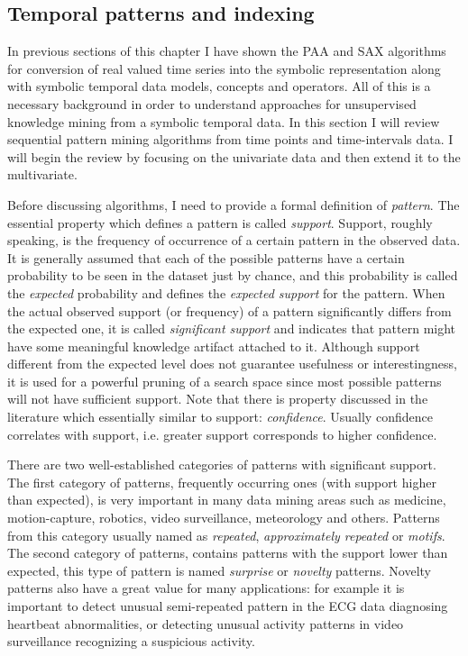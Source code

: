 \subsection{Temporal patterns and indexing} \label{tpatterns}
In previous sections of this chapter I have shown the PAA and SAX algorithms for conversion of real valued time series into the symbolic representation along with symbolic temporal data models, concepts and operators. All of this is a necessary background in order to understand approaches for unsupervised knowledge mining from a symbolic temporal data. In this section I will review sequential pattern mining algorithms from time points and time-intervals data. I will begin the review by focusing on the univariate data and then extend it to the multivariate.

Before discussing algorithms, I need to provide a formal definition of \textit{pattern}. The essential property which defines a pattern is called \textit{support}. Support, roughly speaking, is the frequency of occurrence of a certain pattern in the observed data. It is generally assumed that each of the possible patterns have a certain probability to be seen in the dataset just by chance, and this probability is called the \textit{expected} probability and defines the \textit{expected support} for the pattern. When the actual observed support (or frequency) of a pattern significantly differs from the expected one, it is called \textit{significant support} and indicates that pattern might have some meaningful knowledge artifact attached to it. Although support different from the expected level does not guarantee usefulness or interestingness, it is used for a powerful pruning of a search space since most possible patterns will not have sufficient support. Note that there is property \cite{citeulike:2804633} discussed in the literature which essentially similar to support: \textit{confidence}. Usually confidence correlates with support, i.e. greater support corresponds to higher confidence.

There are two well-established categories of patterns with significant support. The first category of patterns, frequently occurring ones (with support higher than expected), is very important in many data mining areas such as medicine, motion-capture, robotics, video surveillance, meteorology and others. Patterns from this category usually named as \textit{repeated}, \textit{approximately repeated} or \textit{motifs}. The second category of patterns, contains patterns with the support lower than expected, this type of pattern is named \textit{surprise} or \textit{novelty} patterns. Novelty patterns also have a great value for many applications: for example it is important to detect unusual semi-repeated pattern in the ECG data diagnosing heartbeat abnormalities, or detecting unusual activity patterns in video surveillance recognizing a suspicious activity.


